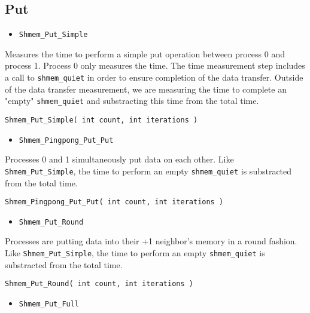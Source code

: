 \documentclass[12pt, letterpaper]{article}
\begin{document}
\subsection{Put}

\begin{itemize}
    \item {\tt Shmem\_Put\_Simple}
\end{itemize}

Measures the time to perform a simple put operation between process 0 and process 1. Process 0 only measures the time. The time measurement step includes a call to {\tt shmem\_quiet} in order to ensure completion of the data transfer. Outside of the data transfer measurement, we are measuring the time to complete an "empty" {\tt shmem\_quiet} and substracting this time from the total time.

\begin{lstlisting}
Shmem_Put_Simple( int count, int iterations )
\end{lstlisting}

\begin{itemize}
    \item {\tt Shmem\_Pingpong\_Put\_Put}
\end{itemize}

Processes 0 and 1 simultaneously put data on each other. Like {\tt Shmem\_Put\_Simple}, the time to perform an empty {\tt shmem\_quiet} is substracted from the total time.

\begin{lstlisting}
Shmem_Pingpong_Put_Put( int count, int iterations )
\end{lstlisting}

\begin{itemize}
    \item {\tt Shmem\_Put\_Round}
\end{itemize}

Processes are putting data into their +1 neighbor's memory in a round fashion. Like  {\tt Shmem\_Put\_Simple}, the time to perform an empty {\tt shmem\_quiet} is substracted from the total time.

\begin{lstlisting}
Shmem_Put_Round( int count, int iterations )
\end{lstlisting}

\begin{itemize}
    \item {\tt Shmem\_Put\_Full}
\end{itemize}
\end{document}
